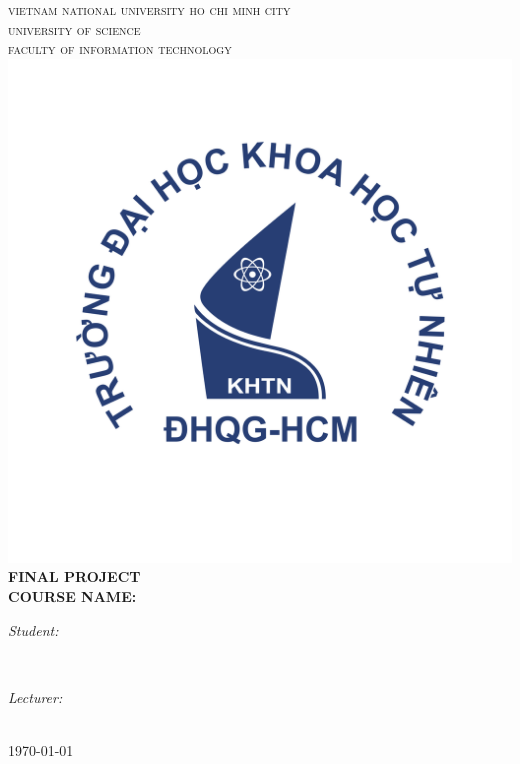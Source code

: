 \begin{titlepage}
\newcommand{\HRule}{\rule{\linewidth}{0.5mm}}
\centering

\textsc{\LARGE vietnam national university ho chi minh city}\\[0.2cm]
\textsc{\LARGE university of science}\\[0.3cm]
\textsc{\Large faculty of information technology}\\[0.5cm]

\includegraphics[scale=.35]{content/hcmus-logo.png}\\[0.5cm]

\huge{\bfseries{FINAL PROJECT}}\\
\textbf{\large COURSE NAME: \coursetitle}\\[0.5cm]

\begin{minipage}[t]{0.45\textwidth}
\begin{flushleft} \large
\emph{Student:}\\
\studentname
\end{flushleft}
\end{minipage}
~
\begin{minipage}[t]{0.45\textwidth}
\begin{flushright} \large
\emph{Lecturer:} \\
\teachername
\end{flushright}
\end{minipage}\\[5cm]

{\large \today}\\[2cm]


\vfill
\end{titlepage}
	